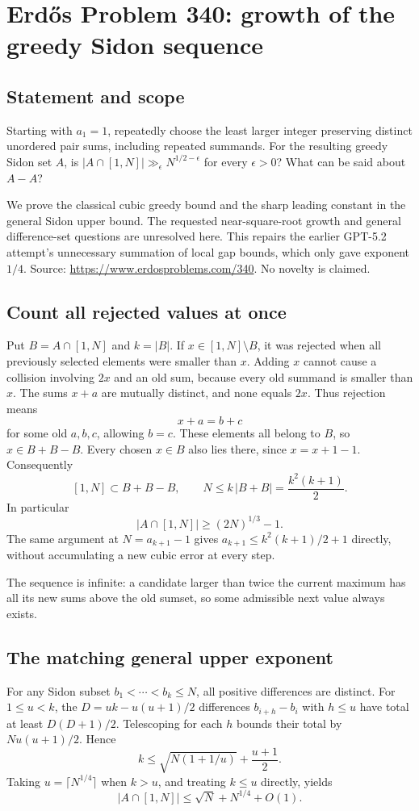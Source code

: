 \section*{Erd\H{o}s Problem 340: growth of the greedy Sidon sequence}
\subsection*{Statement and scope}
Starting with $a_1=1$, repeatedly choose the least larger integer preserving distinct unordered pair sums, including repeated summands. For the resulting greedy Sidon set $A$, is
$|A\cap[1,N]|\gg_\epsilon N^{1/2-\epsilon}$ for every $\epsilon>0$? What can be said about $A-A$?

We prove the classical cubic greedy bound and the sharp leading constant in the general Sidon upper bound. The requested near-square-root growth and general difference-set questions are unresolved here. This repairs the earlier GPT-5.2 attempt's unnecessary summation of local gap bounds, which only gave exponent $1/4$. Source: \url{https://www.erdosproblems.com/340}. No novelty is claimed.

\subsection*{Count all rejected values at once}
Put $B=A\cap[1,N]$ and $k=|B|$. If $x\in[1,N]\setminus B$, it was rejected when all previously selected elements were smaller than $x$. Adding $x$ cannot cause a collision involving $2x$ and an old sum, because every old summand is smaller than $x$. The sums $x+a$ are mutually distinct, and none equals $2x$. Thus rejection means
\[
 x+a=b+c
\]
for some old $a,b,c$, allowing $b=c$. These elements all belong to $B$, so $x\in B+B-B$. Every chosen $x\in B$ also lies there, since $x=x+1-1$. Consequently
\[
 [1,N]\subset B+B-B,\qquad
 N\le k\,|B+B|=\frac{k^2(k+1)}2. \tag{1}
\]
In particular
\[
 |A\cap[1,N]|\ge(2N)^{1/3}-1. \tag{2}
\]
The same argument at $N=a_{k+1}-1$ gives
$a_{k+1}\le k^2(k+1)/2+1$ directly, without accumulating a new cubic error at every step.

The sequence is infinite: a candidate larger than twice the current maximum has all its new sums above the old sumset, so some admissible next value always exists.

\subsection*{The matching general upper exponent}
For any Sidon subset $b_1<\cdots<b_k\le N$, all positive differences are distinct. For $1\le u<k$, the
$D=uk-u(u+1)/2$ differences $b_{i+h}-b_i$ with $h\le u$ have total at least $D(D+1)/2$. Telescoping for each $h$ bounds their total by $N u(u+1)/2$. Hence
\[
 k\le \sqrt{N(1+1/u)}+\frac{u+1}2.
\]
Taking $u=\lceil N^{1/4}\rceil$ when $k>u$, and treating $k\le u$ directly, yields
\[
 |A\cap[1,N]|\le\sqrt N+N^{1/4}+O(1). \tag{3}
\]

